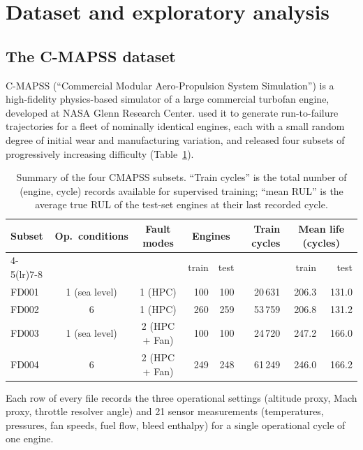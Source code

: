 \documentclass[11pt,letterpaper]{article}
\begin{document}
\section{Dataset and exploratory analysis}\label{sec:data}
\subsection{The C-MAPSS dataset}
C-MAPSS \citep{frederick2007cmapss} (``Commercial Modular
Aero-Propulsion System Simulation'') is a high-fidelity physics-based
simulator of a large commercial turbofan engine, developed at NASA
Glenn Research Center. \citet{saxena2008cmapss} used it to generate
run-to-failure trajectories for a fleet of nominally identical engines,
each with a small random degree of initial wear and manufacturing
variation, and released four subsets of progressively increasing
difficulty (Table~\ref{tab:summary}).

\begin{table}[t]
\centering
\small
\caption{Summary of the four CMAPSS subsets. ``Train cycles'' is the
total number of (engine, cycle) records available for supervised
training; ``mean RUL'' is the average true RUL of the test-set engines
at their last recorded cycle.}
\label{tab:summary}
\begin{tabularx}{\linewidth}{l c c r r r r r}
\toprule
Subset & Op.~conditions & Fault modes &
\multicolumn{2}{c}{Engines} & Train cycles &
\multicolumn{2}{c}{Mean life (cycles)} \\
\cmidrule(lr){4-5}\cmidrule(lr){7-8}
       &      &      & train & test &   & train & test  \\
\midrule
FD001 & 1 (sea level) & 1 (HPC)            & 100 & 100 & 20\,631 & 206.3 & 131.0 \\
FD002 & 6              & 1 (HPC)            & 260 & 259 & 53\,759 & 206.8 & 131.2 \\
FD003 & 1 (sea level) & 2 (HPC + Fan)      & 100 & 100 & 24\,720 & 247.2 & 166.0 \\
FD004 & 6              & 2 (HPC + Fan)      & 249 & 248 & 61\,249 & 246.0 & 166.2 \\
\bottomrule
\end{tabularx}
\end{table}

Each row of every file records the three operational settings (altitude
proxy, Mach proxy, throttle resolver angle) and 21 sensor measurements
(temperatures, pressures, fan speeds, fuel flow, bleed enthalpy) for a
single operational cycle of one engine.
\end{document}
